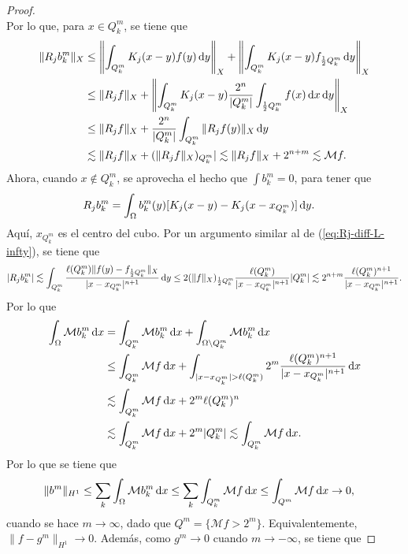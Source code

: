 \begin{proof}
\begin{equation*}
	\end{equation*}
	Por lo que, para $x\in Q_k^m$, se tiene que 
	\begin{align*}
		\|R_jb_k^m\|_X & \leq \left\| \int_{Q_k^m} K_j(x-y)f(y) \mathop{}\!\mathrm{d} y \right\|_X +\left\| \int_{Q_k^m} K_j(x-y)f_{\frac{1}{2}Q_k^m} \mathop{}\!\mathrm{d} y \right\|_X\\
		& \leq \|R_jf\|_X +\left\| \int_{Q_k^m} K_j(x-y)\frac{2^n}{|Q_k^m|}\int_{\frac{1}{2}Q_k^m}f(x)\mathop{}\!\mathrm{d} x \mathop{}\!\mathrm{d} y \right\|_X \\
		& \leq \|R_jf\|_X +\frac{2^n}{|Q_k^m|} \int_{Q_k^m} \|R_jf(y)\|_X \mathop{}\!\mathrm{d} y  \\
		& \lesssim \|R_jf\|_X  + (\|R_jf\|_X)_{Q_k^m}| \lesssim \|R_jf\|_X + 2^{n+m} \lesssim \mathcal{M}f.
	\end{align*}
	Ahora, cuando $x\notin Q_k^m$, se aprovecha el hecho que $\int b_k^m = 0$, para tener que 
	\begin{align*}
		R_jb_k^m&=  \int_{\Omega} b_k^m(y)[K_j(x-y) - K_j(x-x_{Q_k^m} )] \mathop{}\!\mathrm{d} y.
	\end{align*}
	Aquí, $x_{Q_k^m}$ es el centro del cubo. Por un argumento similar al de (\ref{eq:Rj-diff-L-infty}), se tiene que 
	\begin{equation*}
		| R_jb_k^m |\lesssim \int_{Q_k^m} \frac{\ell(Q_k^m)\|f(y) - f_{\frac{1}{2}Q_k^m}\|_X}{|x-x_{Q_k^m}|^{n+1}} \mathop{}\!\mathrm{d} y \leq 2(\|f\|_X)_{\frac{1}{2}Q_k^m} \frac{\ell(Q_k^m)}{|x-x_{Q_k^m}|^{n+1}}|Q_k^m| \lesssim 2^{n+m}\frac{\ell(Q_k^m)^{n+1}}{|x-x_{Q_k^m}|^{n+1}}.
	\end{equation*}
	Por lo que 
	\begin{align*}
		\int_{\Omega}\mathcal{M}{b_k^m} \diff x &= \int_{Q_k^m}\mathcal{M}{b_k^m} \diff x + \int_{\Omega\setminus Q_k^m}\mathcal{M}{b_k^m} \diff x\\
		& \leq \int_{Q_k^m}\mathcal{M}f \diff x + \int_{|x-x_{Q_k^m}|>\ell(Q_k^m)} 2^{m}\frac{\ell(Q_k^m)^{n+1}}{|x-x_{Q_k^m}|^{n+1}} \diff x \\
		& \lesssim  \int_{Q_k^m}\mathcal{M}f \diff x + 2^m\ell(Q_k^m)^n\\
		 & \lesssim  \int_{Q_k^m}\mathcal{M}f \diff x + 2^m|Q_k^m| \lesssim  \int_{Q_k^m}\mathcal{M}f \diff x .
	\end{align*}
	Por lo que se tiene que 
	\begin{align*}
		\|b^m\|_{H^1} & \leq \sum_k	\int_{\Omega}\mathcal{M}{b_k^m} \mathop{}\!\mathrm{d} x \leq \sum_k \int_{Q_k^m} \mathcal{M}f\mathop{}\!\mathrm{d} x \leq \int_{Q^m}\mathcal{M}f\mathop{}\!\mathrm{d} x \to 0,
	\end{align*}
	cuando se hace $m\to\infty$, dado que $Q^m = \{\mathcal{M}f>2^m\}$. Equivalentemente, $\|f-g^m\|_{H^1} \to 0$. Además, como $g^m\to0$ cuando $m\to-\infty$, se tiene que 

\end{proof}
